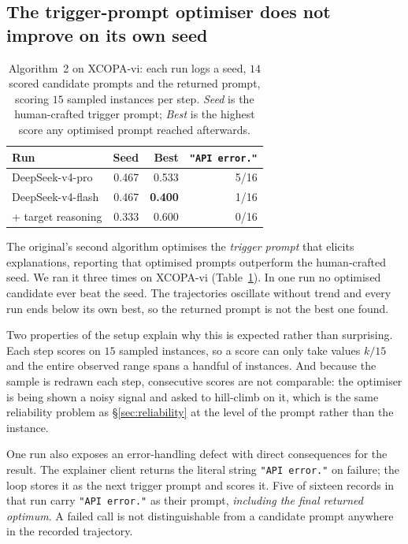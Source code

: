 \documentclass[11pt]{article}
\begin{document}
\subsection{The trigger-prompt optimiser does not improve on its own seed}
\label{sec:alg2}

\begin{table}[t]
\centering\small
\begin{tabular}{lrrr}
\toprule
\textbf{Run} & \textbf{Seed} & \textbf{Best} & \textbf{\texttt{"API error."}} \\
\midrule
DeepSeek-v4-pro   & 0.467 & 0.533 & 5/16 \\
DeepSeek-v4-flash & 0.467 & \textbf{0.400} & 1/16 \\
+ target reasoning & 0.333 & 0.600 & 0/16 \\
\bottomrule
\end{tabular}
\caption{Algorithm~2 on XCOPA-vi: each run logs a seed, $14$ scored candidate
prompts and the returned prompt, scoring $15$ sampled instances per step.
\emph{Seed} is the human-crafted trigger prompt; \emph{Best} is the highest
score any optimised prompt reached afterwards.}
\label{tab:alg2}
\end{table}

The original's second algorithm optimises the \emph{trigger prompt} that elicits
explanations, reporting that optimised prompts outperform the human-crafted seed.
We ran it three times on XCOPA-vi (Table~\ref{tab:alg2}). In one run no
optimised candidate ever beat the seed. The trajectories oscillate without trend
and every run ends below its own best, so the returned prompt is not the best one
found.

Two properties of the setup explain why this is expected rather than surprising.
Each step scores on $15$ sampled instances, so a score can only take values
$k/15$ and the entire observed range spans a handful of instances. And because
the sample is redrawn each step, consecutive scores are not comparable: the
optimiser is being shown a noisy signal and asked to hill-climb on it, which is
the same reliability problem as \S\ref{sec:reliability} at the level of the
prompt rather than the instance.

One run also exposes an error-handling defect with direct consequences for the
result. The explainer client returns the literal string \texttt{"API error."} on
failure; the loop stores it as the next trigger prompt and scores it. Five of
sixteen records in that run carry \texttt{"API error."} as their prompt,
\emph{including the final returned optimum}. A failed call is not distinguishable
from a candidate prompt anywhere in the recorded trajectory.
\end{document}
